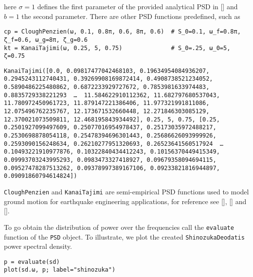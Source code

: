 here \(\sigma=1\) defines the first parameter of the provided analytical PSD in [] and \(b=1\) the second parameter. There are other PSD functions predefined, such as




\begin{verbatim}
cp = CloughPenzien(ω, 0.1, 0.8π, 0.6, 8π, 0.6)  # S_0=0.1, ω_f=0.8π, ζ_f=0.6, ω_g=8π, ζ_g=0.6
kt = KanaiTajimi(ω, 0.25, 5, 0.75)              # S_0=.25, ω_0=5, ζ=0.75
\end{verbatim}


\begin{verbatim}
KanaiTajimi([0.0, 0.09817477042468103, 0.19634954084936207, 0.2945243112740431, 0.39269908169872414, 0.4908738521234052, 0.5890486225480862, 0.6872233929727672, 0.7853981633974483, 0.8835729338221293  …  11.584622910112362, 11.682797680537043, 11.780972450961723, 11.879147221386406, 11.977321991811086, 12.075496762235767, 12.173671532660448, 12.271846303085129, 12.370021073509811, 12.468195843934492], 0.25, 5, 0.75, [0.25, 0.2501927099497609, 0.25077016954978437, 0.25173035972488217, 0.2530698878054118, 0.25478394696301443, 0.25686626093999926, 0.2593090156248634, 0.26210277951320693, 0.26523641560517924  …  0.10493221910977876, 0.10322840434412243, 0.10156370449415349, 0.09993703243995293, 0.0983473327418927, 0.09679358094694115, 0.09527478287513262, 0.09378997389167106, 0.09233821816944897, 0.09091860794614824])
\end{verbatim}



\texttt{CloughPenzien} and \texttt{KanaiTajimi} are semi-empirical PSD functions used to model ground motion for earthquake engineering applications, for reference see [], [] and [].



To go obtain the distribution of power over the frequencies call the \texttt{evaluate} function of the \texttt{PSD} object. To illustrate, we plot the created \texttt{ShinozukaDeodatis} power spectral density.




\begin{verbatim}
p = evaluate(sd)
plot(sd.ω, p; label="shinozuka")
\end{verbatim}



